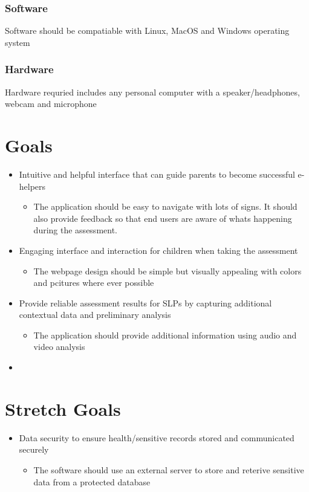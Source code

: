 \documentclass{article}
\begin{document}
\subsubsection{Software}
Software should be compatiable with Linux, MacOS and Windows operating system
\subsubsection{Hardware}
Hardware requried includes any personal computer with a speaker/headphones, webcam and microphone\\

\section{Goals}
\begin{itemize}
    \item Intuitive and helpful interface that can guide parents to become successful e-helpers
    \begin{itemize}
        \item The application should be easy to navigate with lots of signs. It should also provide feedback so that end users are aware of whats happening during the assessment.
    \end{itemize}
    
    \item Engaging interface and interaction for children when taking the assessment
    \begin{itemize}
        \item The webpage design should be simple but visually appealing with colors and pcitures where ever possible 
    \end{itemize}
    
    \item Provide reliable assessment results for SLPs by capturing additional contextual data and preliminary analysis
    \begin{itemize}
        \item The application should provide additional information using audio and video analysis
    \end{itemize}
    \item 
\end{itemize}


\section{Stretch Goals}
\begin{itemize}
    \item Data security to ensure health/sensitive records stored and communicated securely
    \begin{itemize}
        \item The software should use an external server to store and reterive sensitive data from a protected database
    \end{itemize}
\end{itemize}
\end{document}
